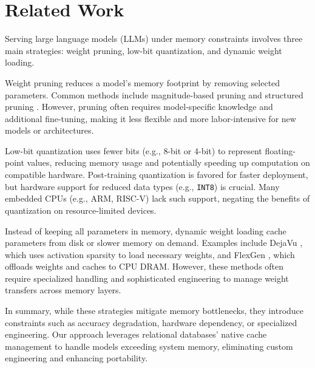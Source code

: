 \section{Related Work}

Serving large language models (LLMs) under memory constraints involves three main strategies: weight pruning, low-bit quantization, and dynamic weight loading. 

Weight pruning reduces a model's memory footprint by removing selected parameters. Common methods include magnitude-based pruning \cite{magnitude_prune1} and structured pruning \cite{structure_prune1, structure_prune2, pruning}. However, pruning often requires model-specific knowledge and additional fine-tuning, making it less flexible and more labor-intensive for new models or architectures.
    
Low-bit quantization uses fewer bits (e.g., 8-bit or 4-bit) to represent floating-point values, reducing memory usage and potentially speeding up computation on compatible hardware. Post-training quantization \cite{quantize1, quantize2, quantize3} is favored for faster deployment, but hardware support for reduced data types (e.g., \texttt{INT8}) is crucial. Many embedded CPUs (e.g., ARM, RISC-V) lack such support, negating the benefits of quantization on resource-limited devices.
    
Instead of keeping all parameters in memory, dynamic weight loading cache parameters from disk or slower memory on demand. Examples include DejaVu \cite{Dejavu}, which uses activation sparsity to load necessary weights, and FlexGen \cite{FlexGen}, which offloads weights and caches to CPU DRAM. However, these methods often require specialized handling and sophisticated engineering to manage weight transfers across memory layers.

In summary, while these strategies mitigate memory bottlenecks, they introduce constraints such as accuracy degradation, hardware dependency, or specialized engineering. Our approach leverages relational databases' native cache management to handle models exceeding system memory, eliminating custom engineering and enhancing portability.

